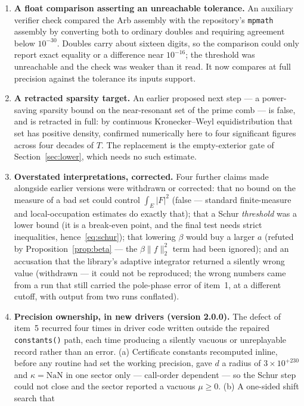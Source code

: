 \documentclass[11pt,a4paper]{article}
\theoremstyle{definition}
\theoremstyle{remark}
\newcommand{\src}[1]{{\footnotesize\texttt{#1}}}
\begin{document}
\begin{enumerate}
  headline number.
\item \textbf{A float comparison asserting an unreachable tolerance.} An
  auxiliary verifier check compared the Arb assembly with the repository's
  \src{mpmath} assembly by converting both to ordinary doubles and requiring
  agreement below $10^{-30}$. Doubles carry about sixteen digits, so the
  comparison could only report exact equality or a difference near $10^{-16}$;
  the threshold was unreachable and the check was weaker than it read. It now
  compares at full precision against the tolerance its inputs support.
\item \textbf{A retracted sparsity target.} An earlier proposed next step --- a
  power-saving sparsity bound on the near-resonant set of the prime comb --- is
  false, and is retracted in full: by continuous Kronecker--Weyl equidistribution
  that set has positive density, confirmed numerically here to four significant
  figures across four decades of $T$. The replacement is the empty-exterior gate
  of Section~\ref{sec:lower}, which needs no such estimate.
\item \textbf{Overstated interpretations, corrected.} Four further claims made
  alongside earlier versions were withdrawn or corrected: that no bound on the
  measure of a bad set could control $\int_E|F|^2$ (false --- standard
  finite-measure and local-occupation estimates do exactly that); that a Schur
  \emph{threshold} was a lower bound (it is a break-even point, and the final
  test needs strict inequalities, hence~\eqref{eq:schur}); that lowering $\beta$
  would buy a larger $a$ (refuted by Proposition~\ref{prop:beta} --- the
  $\beta\|f\|_2^2$ term had been ignored); and an accusation that the library's
  adaptive integrator returned a silently wrong value (withdrawn --- it could not
  be reproduced; the wrong numbers came from a run that still carried the
  pole-phase error of item~1, at a different cutoff, with output from two runs
  conflated).
\item \textbf{Precision ownership, in new drivers (version 2.0.0).} The defect
  of item~5 recurred four times in driver code written outside the repaired
  \src{constants()} path, each time producing a silently vacuous or
  unreplayable record rather than an error. (a) Certificate constants
  recomputed inline, before any routine had set the working precision, gave
  $d$ a radius of $3\times10^{+230}$ and $\kappa = \mathrm{NaN}$ in one sector
  only --- call-order dependent --- so the Schur step could not close and the
  sector reported a vacuous $\mu \ge 0$. (b) A one-sided shift search that

\end{enumerate}
\end{document}

